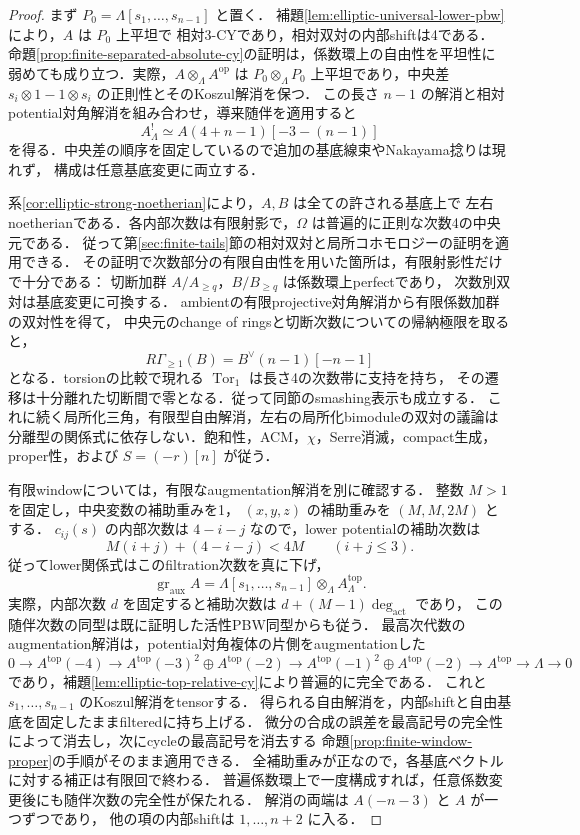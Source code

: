 \begin{proof}
まず $P_0=\Lambda[s_1,\ldots,s_{n-1}]$ と置く．
補題\ref{lem:elliptic-universal-lower-pbw}により，$A$ は $P_0$ 上平坦で
相対3-CYであり，相対双対の内部shiftは4である．
命題\ref{prop:finite-separated-absolute-cy}の証明は，係数環上の自由性を平坦性に
弱めても成り立つ．実際，$A\otimes_\Lambda A^{\mathrm{op}}$ は
$P_0\otimes_\Lambda P_0$ 上平坦であり，中央差
$s_i\otimes1-1\otimes s_i$ の正則性とそのKoszul解消を保つ．
この長さ $n-1$ の解消と相対potential対角解消を組み合わせ，導来随伴を適用すると
\[
 A^!_\Lambda\simeq A(4+n-1)[-3-(n-1)]
\]
を得る．中央差の順序を固定しているので追加の基底線束やNakayama捻りは現れず，
構成は任意基底変更に両立する．

系\ref{cor:elliptic-strong-noetherian}により，$A,B$ は全ての許される基底上で
左右noetherianである．各内部次数は有限射影で，$\Omega$ は普遍的に正則な次数4の中央元である．
従って第\ref{sec:finite-tails}節の相対双対と局所コホモロジーの証明を適用できる．
その証明で次数部分の有限自由性を用いた箇所は，有限射影性だけで十分である：
切断加群 $A/A_{\ge q}$，$B/B_{\ge q}$ は係数環上perfectであり，
次数別双対は基底変更に可換する．
ambientの有限projective対角解消から有限係数加群の双対性を得て，
中央元のchange of ringsと切断次数についての帰納極限を取ると，
\[
 R\Gamma_{\ge1}(B)=B^\vee(n-1)[-n-1]
\]
となる．torsionの比較で現れる $\operatorname{Tor}_1$ は長さ4の次数帯に支持を持ち，
その遷移は十分離れた切断間で零となる．従って同節のsmashing表示も成立する．
これに続く局所化三角，有限型自由解消，左右の局所化bimoduleの双対の議論は
分離型の関係式に依存しない．飽和性，ACM，$\chi$，Serre消滅，compact生成，
proper性，および $S=(-r)[n]$ が従う．

有限windowについては，有限なaugmentation解消を別に確認する．
整数 $M>1$ を固定し，中央変数の補助重みを1，
$(x,y,z)$ の補助重みを $(M,M,2M)$ とする．
$c_{ij}(s)$ の内部次数は $4-i-j$ なので，lower potentialの補助次数は
\[
 M(i+j)+(4-i-j)<4M\qquad (i+j\le3).
\]
従ってlower関係式はこのfiltration次数を真に下げ，
\[
 \operatorname{gr}_{\mathrm{aux}}A
       =\Lambda[s_1,\ldots,s_{n-1}]\otimes_\Lambda A^{\mathrm{top}}_\Lambda.
\]
実際，内部次数 $d$ を固定すると補助次数は $d+(M-1)\deg_{\mathrm{act}}$ であり，
この随伴次数の同型は既に証明した活性PBW同型からも従う．
最高次代数のaugmentation解消は，potential対角複体の片側をaugmentationした
\[
 0\longrightarrow A^{\mathrm{top}}(-4)
 \longrightarrow A^{\mathrm{top}}(-3)^2\oplus A^{\mathrm{top}}(-2)
 \longrightarrow A^{\mathrm{top}}(-1)^2\oplus A^{\mathrm{top}}(-2)
 \longrightarrow A^{\mathrm{top}}\longrightarrow\Lambda\longrightarrow0
\]
であり，補題\ref{lem:elliptic-top-relative-cy}により普遍的に完全である．
これと $s_1,\ldots,s_{n-1}$ のKoszul解消をtensorする．
得られる自由解消を，内部shiftと自由基底を固定したままfilteredに持ち上げる．
微分の合成の誤差を最高記号の完全性によって消去し，次にcycleの最高記号を消去する
命題\ref{prop:finite-window-proper}の手順がそのまま適用できる．
全補助重みが正なので，各基底ベクトルに対する補正は有限回で終わる．
普遍係数環上で一度構成すれば，任意係数変更後にも随伴次数の完全性が保たれる．
解消の両端は $A(-n-3)$ と $A$ が一つずつであり，
他の項の内部shiftは $1,\ldots,n+2$ に入る．


\end{proof}
